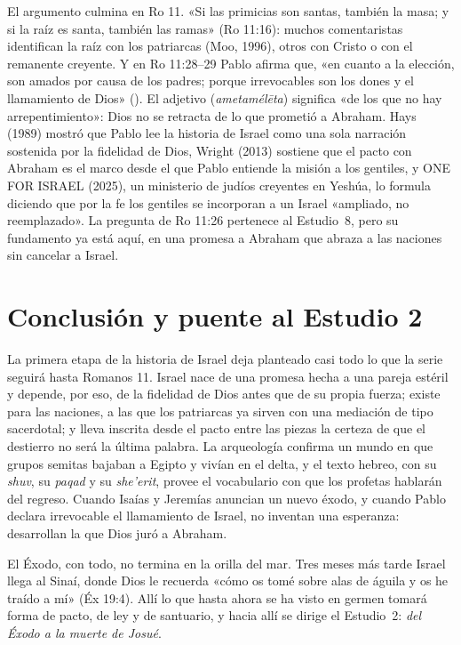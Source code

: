 El argumento culmina en Ro 11. «Si las primicias son santas, también la masa; y si la raíz es santa, también las ramas» (Ro 11:16): muchos comentaristas identifican la raíz con los patriarcas (Moo, 1996), otros con Cristo o con el remanente creyente. Y en Ro 11:28–29 Pablo afirma que, «en cuanto a la elección, son amados por causa de los padres; porque irrevocables son los dones y el llamamiento de Dios» (). El adjetivo  (\emph{ametamélēta}) significa «de los que no hay arrepentimiento»: Dios no se retracta de lo que prometió a Abraham. Hays (1989) mostró que Pablo lee la historia de Israel como una sola narración sostenida por la fidelidad de Dios, Wright (2013) sostiene que el pacto con Abraham es el marco desde el que Pablo entiende la misión a los gentiles, y ONE FOR ISRAEL (2025), un ministerio de judíos creyentes en Yeshúa, lo formula diciendo que por la fe los gentiles se incorporan a un Israel «ampliado, no reemplazado». La pregunta de Ro 11:26 pertenece al Estudio~8, pero su fundamento ya está aquí, en una promesa a Abraham que abraza a las naciones sin cancelar a Israel.

\section{Conclusión y puente al Estudio 2}

La primera etapa de la historia de Israel deja planteado casi todo lo que la serie seguirá hasta Romanos 11. Israel nace de una promesa hecha a una pareja estéril y depende, por eso, de la fidelidad de Dios antes que de su propia fuerza; existe para las naciones, a las que los patriarcas ya sirven con una mediación de tipo sacerdotal; y lleva inscrita desde el pacto entre las piezas la certeza de que el destierro no será la última palabra. La arqueología confirma un mundo en que grupos semitas bajaban a Egipto y vivían en el delta, y el texto hebreo, con su \emph{shuv}, su \emph{paqad} y su \emph{she'erit}, provee el vocabulario con que los profetas hablarán del regreso. Cuando Isaías y Jeremías anuncian un nuevo éxodo, y cuando Pablo declara irrevocable el llamamiento de Israel, no inventan una esperanza: desarrollan la que Dios juró a Abraham.

El Éxodo, con todo, no termina en la orilla del mar. Tres meses más tarde Israel llega al Sinaí, donde Dios le recuerda «cómo os tomé sobre alas de águila y os he traído a mí» (Éx 19:4). Allí lo que hasta ahora se ha visto en germen tomará forma de pacto, de ley y de santuario, y hacia allí se dirige el Estudio~2: \emph{del Éxodo a la muerte de Josué}.

